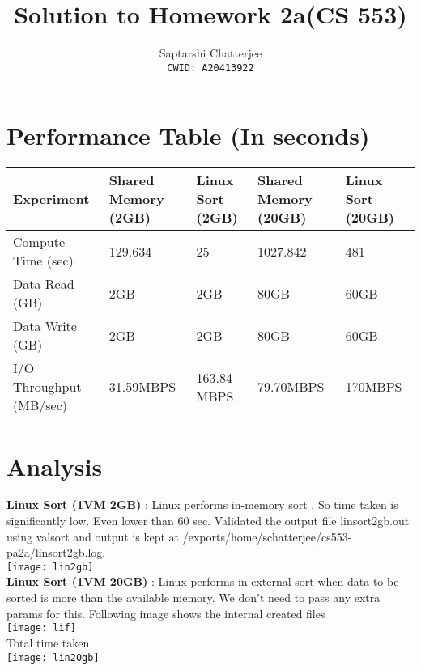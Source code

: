 \documentclass[3pt]{article}
\title{Solution to Homework 2a(CS 553)}
\author{Saptarshi Chatterjee \\
\texttt{CWID: A20413922}
}
\begin{document}
\maketitle

\section{Performance Table (In seconds)}

\setlength{\parskip}{1.2em}
\setlength{\parindent}{0em}

\begin{tabu} to 0.8
 \hline
 Experiment & Shared Memory (2GB) & Linux Sort (2GB) & Shared Memory (20GB) & Linux Sort (20GB) \\
 \hline
 Compute Time (sec)  & 129.634  & 25  & 1027.842 & 481 \\
\hline
 \hline
 Data Read (GB)  & 2GB  & 2GB & 80GB  & 60GB \\
\hline
 \hline
 Data Write (GB)  & 2GB  & 2GB &  80GB  & 60GB \\
\hline
 \hline
 I/O Throughput (MB/sec)  & 31.59MBPS  & 163.84 MBPS & 79.70MBPS & 170MBPS \\
\hline

\end{tabu}

\section{Analysis }


\setlength{\parskip}{1.2em}
\setlength{\parindent}{0em}

\textbf{Linux Sort (1VM 2GB)} : Linux performs in-memory sort . So time taken is significantly low. Even lower than 60 sec. Validated the output file linsort2gb.out  using valsort and output is kept at /exports/home/schatterjee/cs553-pa2a/linsort2gb.log. \\

\texttt{[image: lin2gb]} \\

\textbf{Linux Sort (1VM 20GB)} : Linux performs in external sort when data to be sorted is more than the available memory. We don't need to pass any extra params for this. Following image shows the internal created files \\
\texttt{[image: lif]} \\

Total time taken \\
\texttt{[image: lin20gb]}
\end{document}
